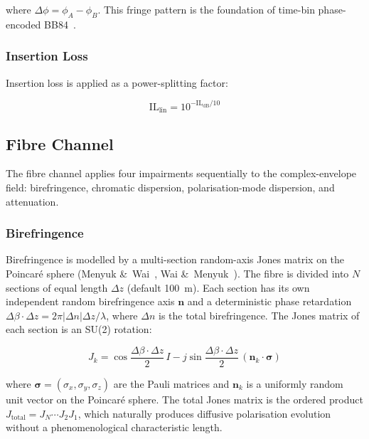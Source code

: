 \documentclass[11pt,a4paper]{article}
\begin{document}
where $\Delta\phi = \phi_A - \phi_B$.  This fringe pattern is the
foundation of time-bin phase-encoded BB84~\cite{bennett84}.

\subsubsection{Insertion Loss}

Insertion loss is applied as a power-splitting factor:

\begin{equation}
  \text{IL}_{\text{lin}} = 10^{-\text{IL}_{\text{dB}}/10}
\end{equation}

\subsection{Fibre Channel}

The fibre channel applies four impairments sequentially to the
complex-envelope field: birefringence, chromatic dispersion,
polarisation-mode dispersion, and attenuation.

\subsubsection{Birefringence}

Birefringence is modelled by a multi-section random-axis Jones matrix
on the Poincar\'e sphere (Menyuk \&~Wai~\cite{menyuk},
Wai \&~Menyuk~\cite{wai}).  The fibre is divided into $N$ sections of
equal length $\Delta z$ (default 100~m).  Each section has its own
independent random birefringence axis $\mathbf{n}$ and a deterministic
phase retardation $\Delta\beta\cdot\Delta z = 2\pi|\Delta n|\Delta z/\lambda$,
where $\Delta n$ is the total birefringence.  The Jones matrix of each
section is an SU(2) rotation:

\begin{equation}
  J_k = \cos\frac{\Delta\beta\cdot\Delta z}{2}\,I
    - j\sin\frac{\Delta\beta\cdot\Delta z}{2}\,(\mathbf{n}_k\cdot\boldsymbol{\sigma})
  \label{eq:biref}
\end{equation}

where $\boldsymbol{\sigma}=(\sigma_x,\sigma_y,\sigma_z)$ are the Pauli
matrices and $\mathbf{n}_k$ is a uniformly random unit vector on the
Poincar\'e sphere.  The total Jones matrix is the ordered product
$J_{\text{total}} = J_N \cdots J_2 J_1$, which naturally produces
diffusive polarisation evolution without a phenomenological
characteristic length.
\end{document}
